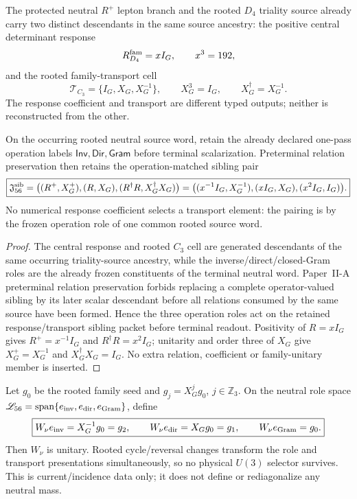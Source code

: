 \documentclass[12pt,a4paper]{article}
\begin{document}
The protected neutral $R^+$ lepton branch and the rooted $D_4$ triality source
already carry two distinct descendants in the same source ancestry: the
positive central determinant response
\[
 R_{D_4}^{\rm fam}=xI_G,\qquad x^3=192,
\]
and the rooted family-transport cell
\[
 \mathscr T_{C_3}=\{I_G,X_G,X_G^{-1}\},\qquad X_G^3=I_G,
 \qquad X_G^\dagger=X_G^{-1}.
\]
The response coefficient and transport are different typed outputs; neither is
reconstructed from the other.

\begin{theorem}
\label{p5:thm:v3100-neutral-response-transport-sibling-jet}
On the occurring rooted neutral source word, retain the already declared
one-pass operation labels
\(\mathsf{Inv},\mathsf{Dir},\mathsf{Gram}\) before terminal scalarization.
Preterminal relation preservation then retains the operation-matched sibling
pair
\[
 \boxed{
 \mathfrak J_{56}^{\rm sib}
 =\bigl(
 (R^+,X_G^+),
 (R,X_G),
 (R^\dagger R,X_G^\dagger X_G)
 \bigr)
 =\bigl(
 (x^{-1}I_G,X_G^{-1}),
 (xI_G,X_G),
 (x^2I_G,I_G)
 \bigr).}
\]
No numerical response coefficient selects a transport element: the pairing is
by the frozen operation role of one common rooted source word.
\end{theorem}

\begin{proof}
The central response and rooted $C_3$ cell are generated descendants of the
same occurring triality-source ancestry, while the inverse/direct/closed-Gram
roles are the already frozen constituents of the terminal neutral word.
Paper~II-A preterminal relation preservation forbids replacing a complete
operator-valued sibling by its later scalar descendant before all relations
consumed by the same source have been formed.  Hence the three operation roles
act on the retained response/transport sibling packet before terminal
readout.  Positivity of $R=xI_G$ gives $R^+=x^{-1}I_G$ and
$R^\dagger R=x^2I_G$; unitarity and order three of $X_G$ give
$X_G^+=X_G^{-1}$ and $X_G^\dagger X_G=I_G$.  No extra relation, coefficient or
family-unitary member is inserted.
\end{proof}

\begin{corollary}
\label{p5:cor:v3100-neutral-regular-module-incidence}
Let $g_0$ be the rooted family seed and
$g_j=X_G^jg_0$, $j\in\mathbb Z_3$.  On the neutral role space
\(\mathscr L_{56}=\operatorname{span}\{e_{\rm inv},e_{\rm dir},e_{\rm Gram}\}\),
define
\[
 \boxed{
 W_\nu e_{\rm inv}=X_G^{-1}g_0=g_2,\qquad
 W_\nu e_{\rm dir}=X_Gg_0=g_1,\qquad
 W_\nu e_{\rm Gram}=g_0.}
\]
Then $W_\nu$ is unitary.  Rooted cycle/reversal changes transform the role and
transport presentations simultaneously, so no physical $U(3)$ selector
survives.  This is current/incidence data only; it does not define or
rediagonalize any neutral mass.
\end{corollary}
\end{document}
